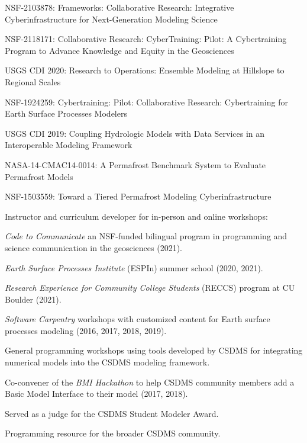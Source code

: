 \begin{compactitem}[\itembullet]
    \begin{compactitem}[\itembullet]
      \item
        NSF-2103878: Frameworks: Collaborative Research: Integrative
        Cyberinfrastructure for Next-Generation Modeling Science
      \item
        NSF-2118171: Collaborative Research: CyberTraining: Pilot: A
        Cybertraining Program to Advance Knowledge and Equity in the Geosciences
      \item
        USGS CDI 2020: Research to Operations: Ensemble Modeling at
        Hillslope to Regional Scales
      \item
        NSF-1924259: Cybertraining: Pilot: Collaborative Research:
        Cybertraining for Earth Surface Processes Modelers
      \item
        USGS CDI 2019: Coupling Hydrologic Models with Data Services
        in an Interoperable Modeling Framework
      \item
        NASA-14-CMAC14-0014: A Permafrost Benchmark System to Evaluate
        Permafrost Models
      \item
        NSF-1503559: Toward a Tiered Permafrost Modeling Cyberinfrastructure
    \end{compactitem}
  \item Instructor and curriculum developer for in-person and online workshops:
    \begin{compactitem}[\itembullet]
      \item
        \textit{Code to Communicate} an NSF-funded bilingual program in
        programming and science communication in the geosciences (2021).
      \item
        \textit{Earth Surface Processes Institute} (ESPIn) summer school (2020,
        2021).
      \item
        \textit{Research Experience for Community College Students} (RECCS)
        program at CU Boulder (2021).
      \item
        \textit{Software Carpentry} workshops with customized content for Earth
        surface processes modeling (2016, 2017, 2018, 2019).
      \item
        General programming workshops using tools developed by CSDMS for
        integrating numerical models into the CSDMS modeling framework.
    \end{compactitem}
    \item
    Co-convener of the \textit{BMI Hackathon} to help CSDMS
    community members add a Basic Model Interface to their model (2017, 2018).
  \item
    Served as a judge for the CSDMS Student Modeler Award.
  \item
    Programming resource for the broader CSDMS community.
\end{compactitem}

